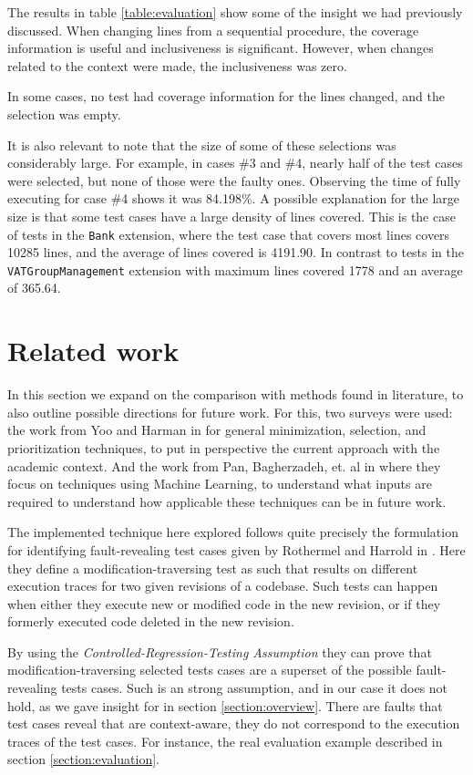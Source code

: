 \documentclass{article}
\begin{document}
The results in table \ref{table:evaluation} show some of the insight we had previously discussed. When changing lines from a sequential procedure, the coverage information is useful and inclusiveness is significant. However, when changes related to the context were made, the inclusiveness was zero.

In some cases, no test had coverage information for the lines changed, and the selection was empty.

It is also relevant to note that the size of some of these selections was considerably large. For example, in cases \#3 and \#4, nearly half of the test cases were selected, but none of those were the faulty ones. Observing the time of fully executing for case \#4 shows it was 84.198\%. A possible explanation for the large size is that some test cases have a large density of lines covered. This is the case of tests in the \texttt{Bank} extension, where the test case that covers most lines covers 10285 lines, and the average of lines covered is 4191.90. In contrast to tests in the \texttt{VATGroupManagement} extension with maximum lines covered 1778 and an average of 365.64.

\section{Related work}\label{section:alg-and-context}

In this section we expand on the comparison with methods found in literature, to also outline possible directions for future work. For this, two surveys were used: the work from Yoo and Harman in \cite{Yoo2009RegressionTM} for general minimization, selection, and prioritization techniques, to put in perspective the current approach with the academic context. And the work from Pan, Bagherzadeh, et. al in \cite{Pan2021TestCS} where they focus on techniques using Machine Learning, to understand what inputs are required to understand how applicable these techniques can be in future work.

The implemented technique here explored follows quite precisely the formulation for identifying fault-revealing test cases given by Rothermel and Harrold in \cite{962562}. Here they define a modification-traversing test as such that results on different execution traces for two given revisions of a codebase. Such tests can happen when either they execute new or modified code in the new revision, or if they formerly executed code deleted in the new revision.

By using the \emph{Controlled-Regression-Testing Assumption} they can prove that modification-traversing selected tests cases are a superset of the possible fault-revealing tests cases. Such is an strong assumption, and in our case it does not hold, as we gave insight for in section \ref{section:overview}. There are faults that test cases reveal that are context-aware, they do not correspond to the execution traces of the test cases. For instance, the real evaluation example described in section \ref{section:evaluation}.
\end{document}
